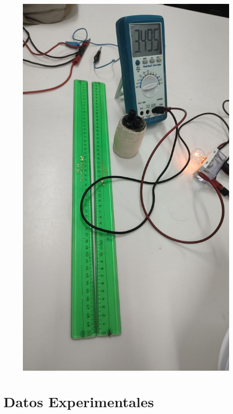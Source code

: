 \documentclass[10pt]{article}
\begin{document}
\begin{multicols}{2}
	\begin{figure}[H]
		\includegraphics[scale = .2]{./Images/ME2.jpeg}
	\end{figure}


\end{multicols}

\section{Datos Experimentales}
\end{document}
